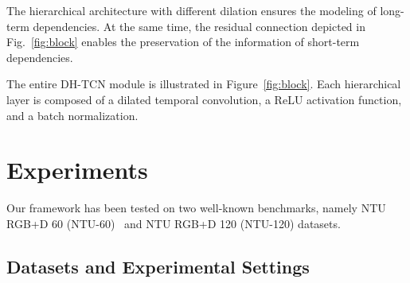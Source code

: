 \documentclass{article}
\begin{document}
The hierarchical architecture with different dilation ensures the modeling of long-term dependencies. At the same time, the residual connection depicted in Fig.~\ref{fig:block} enables the preservation of the information of short-term dependencies. 

The entire DH-TCN module is illustrated in Figure~\ref{fig:block}. Each hierarchical layer is composed of a dilated temporal convolution, a ReLU activation function, and a batch normalization.


\section{Experiments}
\label{sec:experiments}

Our framework has been tested on two well-known benchmarks, namely NTU RGB+D 60 (NTU-60)~\cite{Shahroudy_2016_NTURGBD} and NTU RGB+D 120 (NTU-120) \cite{Liu_2019_NTURGBD120} datasets. 

\subsection{Datasets and Experimental Settings}
\label{sec:datasets}
\end{document}
